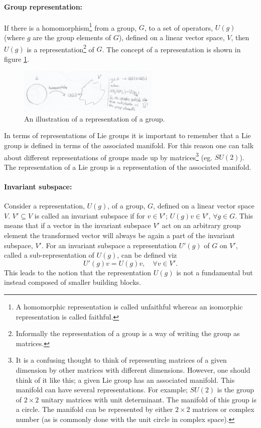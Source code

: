 \paragraph{Group representation: }
If there is a homomorphism\footnote{A homomorphic representation is called unfaithful whereas an isomorphic representation is called faithful.} from a group, $G$, to a set of operators, $U(g)$ (where $g$ are the group elements of $G$), defined on a linear vector space, $V$, then $U(g)$ is a representation\footnote{Informally the representation of a group is a way of writing the group as matrices.} of $G$. The concept of a representation is shown in figure \ref{fig:4}.
\begin{figure}[h]
	\captionsetup{width=1\textwidth}
	\centering
	\includegraphics[width=0.6\textwidth]{figures/4}
	\caption{An illustration of a representation of a group.}
	\label{fig:4}
\end{figure} 
In terms of representations of Lie groups it is important to remember that a Lie group is defined in terms of the associated manifold. For this reason one can talk about different representations of groups made up by matrices\footnote{It is a confusing thought to think of representing matrices of a given dimension by other matrices with different dimensions. However, one should think of it like this; a given Lie group has an associated manifold. This manifold can have several representations. For example; $SU(2)$ is the group of $2\times 2$ unitary matrices with unit determinant. The manifold of this group is a circle. The manifold can be represented by either $2\times 2$ matrices or complex number (as is commonly done with the unit circle in complex space).} (eg. $SU(2)$). The representation of a Lie group is a representation of the associated manifold.

\paragraph{Invariant subspace:} Consider a representation, $U(g)$, of a group, $G$, defined on a linear vector space $V$. $V'\subseteq V$ is called an invariant subspace if for $v\in V'$; $U(g)v\in V'$, $\forall g\in G$. This means that if a vector in the invariant subspace $V'$ act on an arbitrary group element the transformed vector will always be again a part of the invariant subspace, $V'$. For an invariant subspace a representation $U'(g)$ of $G$ on $V'$, called a sub-representation of $U(g)$, can be defined viz
\begin{equation}
	U'(g)v=U(g)v,\quad \forall v\in V'.
\end{equation} 
This leads to the notion that the representation $U(g)$ is not a fundamental but instead composed of smaller building blocks. 

